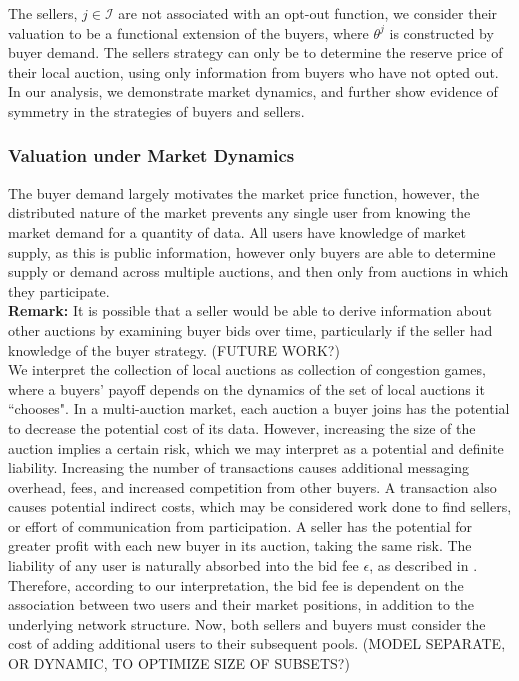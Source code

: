 \documentclass[sigconf, anonymous]{acmart}
\newcommand{\mcI}{\mathcal{I}}
\theoremstyle{definition}
\begin{document}
The sellers, $j\in\mcI$ are not associated with an opt-out function, we
consider their valuation to be a functional extension of the buyers, where
$\theta^j$ is constructed by buyer demand.
The sellers strategy can only be to determine the reserve price of their local
auction, using only information from buyers who have not opted out.
In our analysis, we demonstrate market dynamics, and further show evidence of symmetry in the strategies of
buyers and sellers.

\subsubsection{Valuation under Market Dynamics}
The buyer demand largely motivates the market price function, however, the
distributed nature of the market prevents any single user from knowing the
market demand for a quantity of data. All users have knowledge of market
supply, as this is public information, however only buyers
are able to determine supply or demand across multiple auctions, and then only from auctions
in which they participate. \\
\textbf{Remark:}
It is possible that a seller would be able to derive information about other
auctions by examining buyer bids over time, particularly if the seller had knowledge of the
buyer strategy. (FUTURE WORK?)\\

We interpret the collection of local auctions as collection of congestion games,
where a buyers' payoff depends on the dynamics of the set of local auctions it
``chooses".
In a multi-auction market, each auction a buyer joins has the potential to
decrease the potential cost of its data. However, increasing the size of the
auction implies a certain risk, which we may interpret as a potential and
definite
liability. Increasing the number of transactions causes additional messaging
overhead, fees, and increased competition from other buyers. 
A transaction also causes potential indirect costs, which may be considered work done to find
sellers, or effort of communication from participation. A seller
has the potential for greater profit with each new buyer in its auction, taking 
the same risk.
The liability of any user is naturally absorbed into the bid fee $\epsilon$,
as described in \cite{semret}. Therefore, according to our interpretation, the bid fee is
dependent on the association between two users and their market positions, in
addition to the underlying network structure. Now, both sellers and buyers must consider
the cost of adding additional users to their subsequent pools. (MODEL SEPARATE,
OR DYNAMIC, TO OPTIMIZE SIZE OF SUBSETS?)
\end{document}
